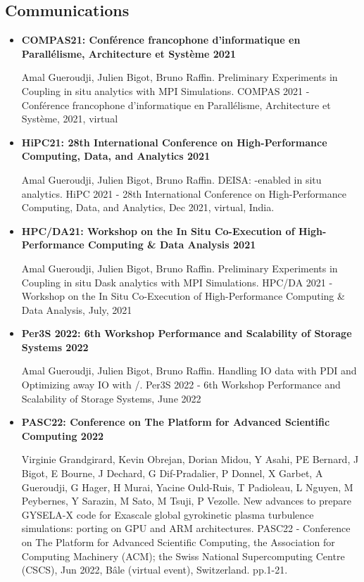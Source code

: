 \subsection{Communications}
\begin{itemize}
  
  \item \textbf{COMPAS21: Conférence francophone d'informatique en Parallélisme, Architecture et Système 2021}

Amal Gueroudji, Julien Bigot, Bruno Raffin. Preliminary Experiments in Coupling in situ \dask analytics with MPI Simulations. COMPAS 2021 - Conférence francophone d'informatique en Parallélisme, Architecture et Système, 2021, virtual

  \item  \textbf{HiPC21:  28th International Conference on High-Performance Computing, Data, and Analytics 2021}

Amal Gueroudji, Julien Bigot, Bruno Raffin. DEISA: \dask-enabled in situ analytics. HiPC 2021 - 28th
International Conference on High-Performance Computing, Data, and Analytics, Dec 2021, virtual,
India. 

  \item \textbf{HPC/DA21:  Workshop on the In Situ Co-Execution of High-Performance Computing \& Data Analysis 2021}

Amal Gueroudji, Julien Bigot, Bruno Raffin. Preliminary Experiments in Coupling in situ Dask analytics with MPI Simulations. HPC/DA 2021 - Workshop on the In Situ Co-Execution of
High-Performance Computing \& Data Analysis, July, 2021

  \item  \textbf{Per3S 2022: 6th Workshop Performance and Scalability of Storage Systems 2022}

Amal Gueroudji, Julien Bigot, Bruno Raffin. Handling IO data with PDI and Optimizing away IO with \pdi/\deisa. Per3S 2022 - 6th Workshop Performance and Scalability of Storage Systems, June 2022


  \item \textbf{PASC22: Conference on The Platform for Advanced Scientific Computing 2022}

Virginie Grandgirard, Kevin Obrejan, Dorian Midou, Y Asahi, PE Bernard, J Bigot, E Bourne, J Dechard, G Dif-Pradalier, P Donnel, X Garbet, A Gueroudji, G Hager, H Murai, Yacine Ould-Ruis, T Padioleau, L Nguyen, M Peybernes, Y Sarazin, M Sato, M Tsuji, P Vezolle. New advances to prepare GYSELA-X code for Exascale global gyrokinetic plasma turbulence simulations: porting on GPU and ARM architectures. PASC22 - Conference on The Platform for Advanced Scientific Computing, the Association for Computing Machinery (ACM); the Swiss National Supercomputing Centre (CSCS), Jun 2022, Bâle (virtual event), Switzerland. pp.1-21. 


\end{itemize}
